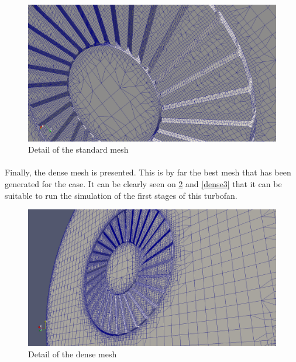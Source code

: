 \begin{figure}[h!]
\includegraphics[scale=0.24]{./mesh/screenshots/std3}
\centering
\caption{Detail of the standard mesh}
\label{standard2}
\end{figure}

\newpage{}

\paragraph{}Finally, the dense mesh is presented. This is by far the best mesh that has been generated for the case. It can be clearly seen on \ref{dense2} and \ref{dense3}  that it can be suitable to run the simulation of the first stages of this turbofan.



\begin{figure}[h!]
\includegraphics[scale=0.24]{./mesh/screenshots/Xtreme3}
\centering
\caption{Detail of the dense mesh}
\label{dense2}
\end{figure}

